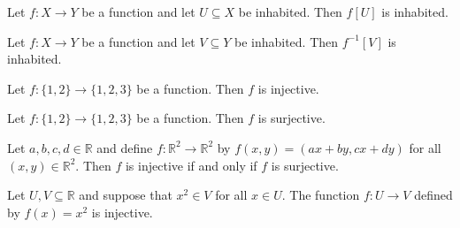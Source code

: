 \begin{chapex} %
Let $f : X \to Y$ be a function and let $U \subseteq X$ be inhabited. Then $f[U]$ is inhabited.
\end{chapex}

\begin{chapex} %
Let $f : X \to Y$ be a function and let $V \subseteq Y$ be inhabited. Then $f^{-1}[V]$ is inhabited.
\end{chapex}

\begin{chapex} %
Let $f : \{ 1, 2 \} \to \{ 1, 2, 3 \}$ be a function. Then $f$ is injective.
\end{chapex}

\begin{chapex} %
Let $f : \{ 1, 2 \} \to \{ 1, 2, 3 \}$ be a function. Then $f$ is surjective.
\end{chapex}

\begin{chapex} %
Let $a,b,c,d \in \mathbb{R}$ and define $f : \mathbb{R}^2 \to \mathbb{R}^2$ by $f(x,y) = (ax+by,cx+dy)$ for all $(x,y) \in \mathbb{R}^2$. Then $f$ is injective if and only if $f$ is surjective.
\end{chapex}

\begin{chapex} %
\label{cqFunctionsASNEnd}
Let $U, V \subseteq \mathbb{R}$ and suppose that $x^2 \in V$ for all $x \in U$. The function $f : U \to V$ defined by $f(x) = x^2$ is injective.
\end{chapex}